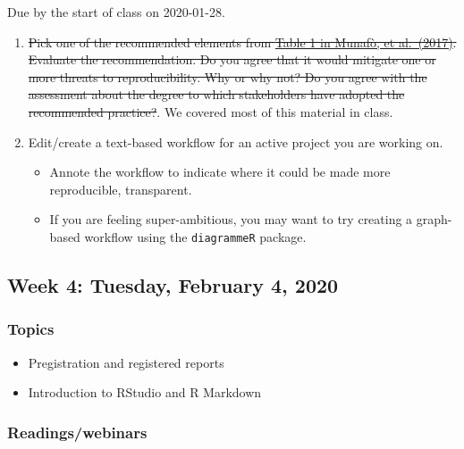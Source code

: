 \documentclass[
]{article}
\providecommand{\tightlist}{%
  \setlength{\itemsep}{0pt}\setlength{\parskip}{0pt}}
\begin{document}
Due by the start of class on 2020-01-28.

\begin{enumerate}
\def\labelenumi{\arabic{enumi}.}
\tightlist
\item
  \sout{Pick one of the recommended elements from
  \href{http://www.nature.com/articles/s41562-016-0021/tables/1}{Table 1
  in Munafò, et al.~(2017)}. Evaluate the recommendation. Do you agree
  that it would mitigate one or more threats to reproducibility. Why or
  why not? Do you agree with the assessment about the degree to which
  stakeholders have adopted the recommended practice?}. We covered most
  of this material in class.
\item
  Edit/create a text-based workflow for an active project you are
  working on.

  \begin{itemize}
  \tightlist
  \item
    Annote the workflow to indicate where it could be made more
    reproducible, transparent.
  \item
    If you are feeling super-ambitious, you may want to try creating a
    graph-based workflow using the \texttt{diagrammeR} package.
  \end{itemize}
\end{enumerate}

\hypertarget{week-4-tuesday-february-4-2020}{%
\subsection{Week 4: Tuesday, February 4,
2020}\label{week-4-tuesday-february-4-2020}}

\hypertarget{topics-3}{%
\subsubsection{Topics}\label{topics-3}}

\begin{itemize}
\tightlist
\item
  Pregistration and registered reports
\item
  Introduction to RStudio and R Markdown
\end{itemize}

\hypertarget{readingswebinars-2}{%
\subsubsection{Readings/webinars}\label{readingswebinars-2}}
\end{document}
